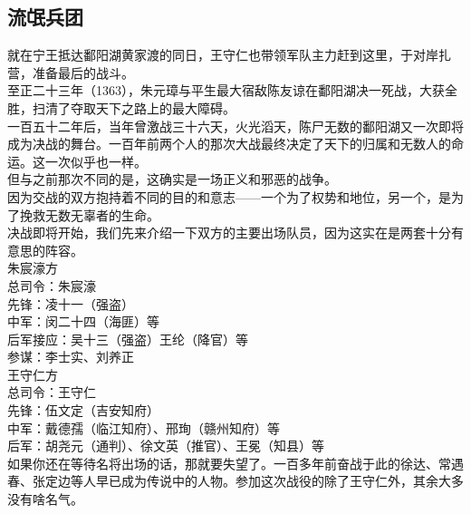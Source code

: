 \begin{multicols}{\theparacolNo}
\subsection{流氓兵团}
就在宁王抵达鄱阳湖黄家渡的同日，王守仁也带领军队主力赶到这里，于对岸扎营，准备最后的战斗。\\

至正二十三年（1363），朱元璋与平生最大宿敌陈友谅在鄱阳湖决一死战，大获全胜，扫清了夺取天下之路上的最大障碍。\\

一百五十二年后，当年曾激战三十六天，火光滔天，陈尸无数的鄱阳湖又一次即将成为决战的舞台。一百年前两个人的那次大战最终决定了天下的归属和无数人的命运。这一次似乎也一样。\\

但与之前那次不同的是，这确实是一场正义和邪恶的战争。\\

因为交战的双方抱持着不同的目的和意志——一个为了权势和地位，另一个，是为了挽救无数无辜者的生命。\\

决战即将开始，我们先来介绍一下双方的主要出场队员，因为这实在是两套十分有意思的阵容。\\

朱宸濠方\\

总司令：朱宸濠\\

先锋：凌十一（强盗）\\

中军：闵二十四（海匪）等\\

后军接应：吴十三（强盗）王纶（降官）等\\

参谋：李士实、刘养正\\

王守仁方\\

总司令：王守仁\\

先锋：伍文定（吉安知府）\\

中军：戴德孺（临江知府）、邢珣（赣州知府）等\\

后军：胡尧元（通判）、徐文英（推官）、王冕（知县）等\\

如果你还在等待名将出场的话，那就要失望了。一百多年前奋战于此的徐达、常遇春、张定边等人早已成为传说中的人物。参加这次战役的除了王守仁外，其余大多没有啥名气。\\


\end{multicols}
